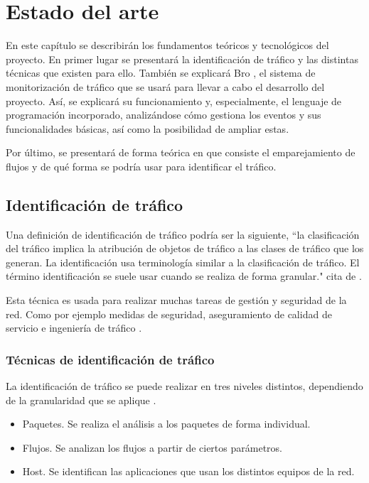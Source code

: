\chapter{Estado del arte}\label{estadoarte}

En este capítulo se describirán los fundamentos teóricos y tecnológicos del proyecto. En primer lugar se presentará 
la identificación de tráfico y las distintas técnicas que existen para ello. También se explicará Bro \cite{broindex}, el 
sistema de monitorización de tráfico que se usará para 
llevar a cabo el desarrollo del proyecto. Así, se explicará su funcionamiento y, especialmente, el lenguaje de programación 
incorporado, analizándose cómo gestiona los eventos y sus funcionalidades básicas, así como la posibilidad de ampliar estas.

\intro Por último, se presentará de forma teórica en que consiste el emparejamiento de flujos y de qué forma 
se podría usar para identificar el tráfico.

\section{Identificación de tráfico}

Una definición de identificación de tráfico podría ser la siguiente, ``la clasificación del tráfico implica la atribución de objetos 
de tráfico a las clases de tráfico que los generan. La identificación usa terminología similar a la clasificación de tráfico. El 
término identificación se suele usar cuando se realiza de forma granular." cita de \cite{khalife2014}.

\intro Esta técnica es usada para realizar muchas tareas de gestión y seguridad de la red. Como por ejemplo medidas de seguridad, 
aseguramiento de calidad de servicio \cite{microqos} e ingeniería de tráfico \cite{khalife2016}.

\subsection{Técnicas de identificación de tráfico}

La identificación de tráfico se puede realizar en tres niveles distintos, dependiendo de la granularidad que se aplique 
\cite{khalife2016}.

\begin{itemize}
\item Paquetes. Se realiza el análisis a los paquetes de forma individual.
\item Flujos. Se analizan los flujos a partir de ciertos parámetros.
\item Host. Se identifican las aplicaciones que usan los distintos equipos de la red.
\end{itemize}

